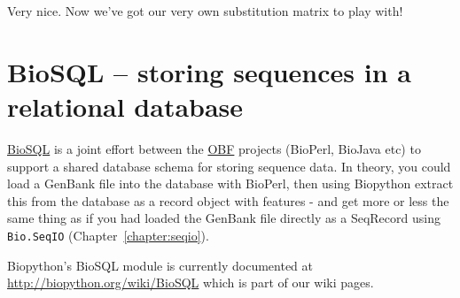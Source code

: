 Very nice. Now we've got our very own substitution matrix to play with!

\section{BioSQL -- storing sequences in a relational database}
\label{sec:BioSQL}
\href{https://www.biosql.org/}{BioSQL} is a joint effort between the
\href{https://www.open-bio.org/wiki/Main_Page}{OBF} projects (BioPerl, BioJava etc) to support a
shared database schema for storing sequence data. In theory, you could load a
GenBank file into the database with BioPerl, then using Biopython extract this
from the database as a record object with features - and get more or less the same
thing as if you had loaded the GenBank file directly as a SeqRecord using
\verb|Bio.SeqIO| (Chapter~\ref{chapter:seqio}).

Biopython's BioSQL module is currently documented at
\url{http://biopython.org/wiki/BioSQL} which is part of our wiki pages.
